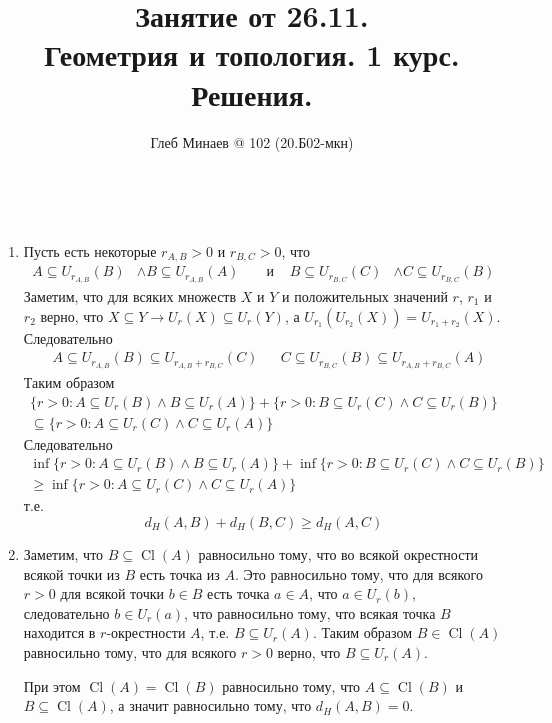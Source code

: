 \documentclass[12pt,a4paper]{article}
\title{Занятие от 26.11.\\Геометрия и топология. 1 курс.\\Решения.}
\author{Глеб Минаев @ 102 (20.Б02-мкн)}
\DeclareMathOperator{\Cl}{Cl}
\begin{document}
    \maketitle

    \begin{problem}{39}\ 
        \begin{enumerate}
            \renewcommand{\theenumi}{\asbuk{enumi}}
            \renewcommand{\labelenumi}{\theenumi)}
            \setcounter{enumi}{2}
            \item Пусть есть некоторые $r_{A, B} > 0$ и $r_{B, C} > 0$, что
                \begin{align*}
                    A \subseteq U_{r_{A, B}}(B) &\wedge B \subseteq U_{r_{A, B}}(A)&
                    &\text{ и }&
                    B \subseteq U_{r_{B, C}}(C) &\wedge C \subseteq U_{r_{B, C}}(B)
                \end{align*}
                Заметим, что для всяких множеств $X$ и $Y$ и положительных значений $r$, $r_1$ и $r_2$ верно, что $X \subseteq Y \rightarrow U_r(X) \subseteq U_r(Y)$, а $U_{r_1}(U_{r_2}(X)) = U_{r_1+r_2}(X)$. Следовательно
                \begin{align*}
                    &A \subseteq U_{r_{A, B}}(B) \subseteq U_{r_{A, B} + r_{B, C}}(C)&
                    &C \subseteq U_{r_{B, C}}(B) \subseteq U_{r_{A, B} + r_{B, C}}(A)
                \end{align*}
                Таким образом
                \begin{multline*}
                    \{r > 0: A \subseteq U_r(B) \wedge B \subseteq U_r(A)\}
                    + \{r > 0: B \subseteq U_r(C) \wedge C \subseteq U_r(B)\}\\
                    \subseteq \{r > 0: A \subseteq U_r(C) \wedge C \subseteq U_r(A)\}
                \end{multline*}
                Следовательно
                \begin{multline*}
                    \inf \{r > 0: A \subseteq U_r(B) \wedge B \subseteq U_r(A)\}
                    + \inf \{r > 0: B \subseteq U_r(C) \wedge C \subseteq U_r(B)\}\\
                    \geqslant \inf \{r > 0: A \subseteq U_r(C) \wedge C \subseteq U_r(A)\}
                \end{multline*}
                т.е.
                \[d_H(A, B) + d_H(B, C) \geqslant d_H(A, C)\]
            
            \item Заметим, что $B \subseteq \Cl(A)$ равносильно тому, что во всякой окрестности всякой точки из $B$ есть точка из $A$. Это равносильно тому, что для всякого $r > 0$ для всякой точки $b \in B$ есть точка $a \in A$, что $a \in U_r(b)$, следовательно $b \in U_r(a)$, что равносильно тому, что всякая точка $B$ находится в $r$-окрестности $A$, т.е. $B \subseteq U_r(A)$. Таким образом $B \in \Cl(A)$ равносильно тому, что для всякого $r > 0$ верно, что $B \subseteq U_r(A)$.
            
            При этом $\Cl(A) = \Cl(B)$ равносильно тому, что $A \subseteq \Cl(B)$ и $B \subseteq \Cl(A)$, а значит равносильно тому, что $d_H(A, B) = 0$.
        \end{enumerate}
    \end{problem}
\end{document}
